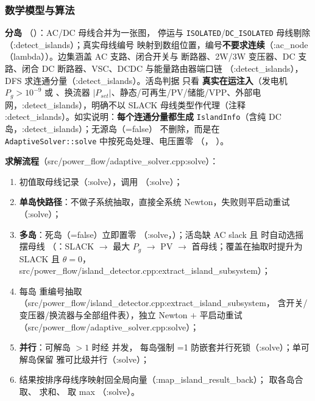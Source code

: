 \subsubsection*{数学模型与算法}
\textbf{分岛} 
（）：AC/DC 母线合并为一张图，
停运与 \texttt{ISOLATED}/\texttt{DC\_ISOLATED} 母线剔除（:detect\_islands）；真实母线编号
映射到数组位置，编号\textbf{不要求连续}（:ac\_node（lambda））。边集涵盖 AC 支路、闭合开关与
断路器、2W/3W 变压器、DC 支路、闭合 DC 断路器、VSC、DCDC 与能量路由器端口链
（:detect\_islands），DFS 求连通分量（:detect\_islands）。活岛判据  只看
\textbf{真实在运注入}（发电机 $P_g>10^{-9}$ 或 、换流器
$|P_{set}|$、静态/可再生/PV/储能/VPP、外部电网，:detect\_islands），明确不以 SLACK
母线类型作代理（注释 :detect\_islands）。如实说明：\textbf{每个连通分量都生成}
\texttt{IslandInfo}（含纯 DC 岛，:detect\_islands）；无源岛（=false）
不删除，而是在 \texttt{AdaptiveSolver::solve} 中按死岛处理、电压置零
（，
）。

\textbf{求解流程}（src/power\_flow/adaptive\_solver.cpp:solve）：
\begin{enumerate}
  \item 初值取母线记录（:solve），调用 （:solve）；
  \item \textbf{单岛快路径}：不做子系统抽取，直接全系统 Newton，失败则平启动重试
        （:solve）；
  \item \textbf{多岛}：死岛（=false）立即置零
        （:solve，）；活岛缺 AC slack 且
         时自动选摇摆母线
        （：SLACK $\to$ 最大 $P_g$ $\to$
        PV $\to$ 首母线；覆盖在抽取时提升为 SLACK 且 $\theta=0$，
        src/power\_flow/island\_detector.cpp:extract\_island\_subsystem）；
  \item 每岛  重编号抽取（src/power\_flow/island\_detector.cpp:extract\_island\_subsystem，
        含开关/变压器/换流器与全部组件表），独立 Newton $+$ 平启动重试
        （src/power\_flow/adaptive\_solver.cpp:solve）；
  \item \textbf{并行}：可解岛 $>1$ 时经  并发，
        每岛强制 =1 防嵌套并行死锁（:solve）；单可解岛保留
        雅可比级并行（:solve）；
  \item 结果按排序母线序映射回全局向量（:map\_island\_result\_back）；
         取各岛合取、 求和、 取 max
        （:solve）。
\end{enumerate}

